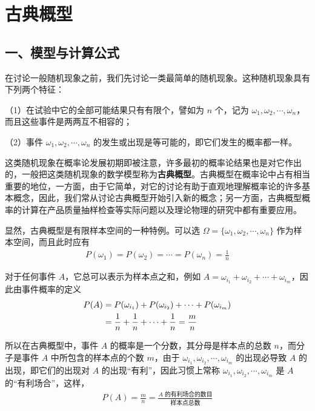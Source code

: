 \documentclass[../../main.tex]{subfiles}
\begin{document}
\section{古典概型}\label{section:ch01-古典概型}

\subsection*{一、模型与计算公式}

在讨论一般随机现象之前，我们先讨论一类最简单的随机现象。这种随机现象具有下列两个特征：

（1）在试验中它的全部可能结果只有有限个，譬如为 $n$ 个，记为 $\omega_1,\omega_2,\cdots,\omega_n$，而且这些事件是两两互不相容的；

（2）事件 $\omega_1,\omega_2,\cdots,\omega_n$ 的发生或出现是等可能的，即它们发生的概率都一样。

这类随机现象在概率论发展初期即被注意，许多最初的概率论结果也是对它作出的，一般把这类随机现象的数学模型称为\textbf{古典概型}。古典概型在概率论中占有相当重要的地位，一方面，由于它简单，对它的讨论有助于直观地理解概率论的许多基本概念，因此，我们常从讨论古典概型开始引入新的概念；另一方面，古典概型概率的计算在产品质量抽样检查等实际问题以及理论物理的研究中都有重要应用。

显然，古典概型是有限样本空间的一种特例。可以选 $\Omega=\{\omega_1,\omega_2,\cdots,\omega_n\}$ 作为样本空间，而且此时应有
\begin{align}
P(\omega_1)=P(\omega_2)=\cdots=P(\omega_n)=\frac{1}{n}\label{align:ch01-等可能}
\end{align}

对于任何事件 $A$，它总可以表示为样本点之和，例如 $A=\omega_{i_1}+\omega_{i_2}+\cdots+\omega_{i_m}$，因此由事件概率的定义
\begin{align}
P(A)&=P(\omega_{i_1})+P(\omega_{i_2})+\cdots+P(\omega_{i_m})\notag\\
&=\frac{1}{n}+\frac{1}{n}+\cdots+\frac{1}{n}=\frac{m}{n}\label{align:ch01-古典概率}
\end{align}

所以在古典概型中，事件 $A$ 的概率是一个分数，其分母是样本点的总数 $n$，而分子是事件 $A$ 中所包含的样本点的个数 $m$，由于 $\omega_{i_1},\omega_{i_2},\cdots,\omega_{i_m}$ 的出现必导致 $A$ 的出现，即它们的出现对 $A$ 的出现“有利”，因此习惯上常称 $\omega_{i_1},\omega_{i_2},\cdots,\omega_{i_m}$ 是 $A$ 的“有利场合”，这样，
\begin{align}
P(A)=\frac{m}{n}=\frac{A\text{ 的有利场合的数目}}{\text{样本点总数}}\label{align:ch01-古典概率定义}
\end{align}
\end{document}
